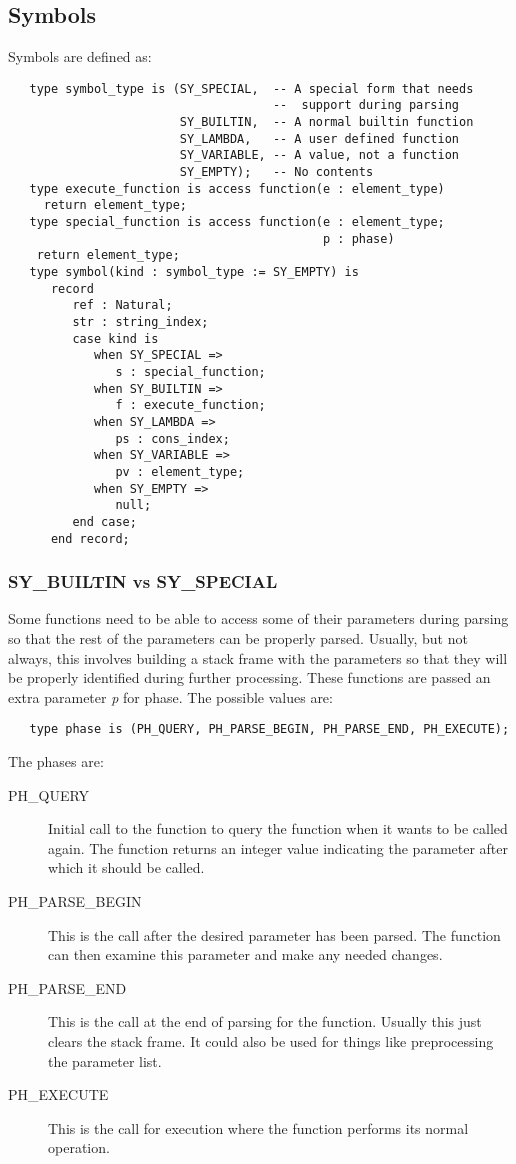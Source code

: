 \documentclass[10pt, openany]{book}
\begin{document}
\subsection{Symbols}
\label{sec:Symbols}
Symbols are defined as:
\begin{lstlisting}
   type symbol_type is (SY_SPECIAL,  -- A special form that needs
                                     --  support during parsing
                        SY_BUILTIN,  -- A normal builtin function
                        SY_LAMBDA,   -- A user defined function
                        SY_VARIABLE, -- A value, not a function
                        SY_EMPTY);   -- No contents
   type execute_function is access function(e : element_type)
     return element_type;
   type special_function is access function(e : element_type;
                                            p : phase)
    return element_type;
   type symbol(kind : symbol_type := SY_EMPTY) is
      record
         ref : Natural;
         str : string_index;
         case kind is
            when SY_SPECIAL =>
               s : special_function;
            when SY_BUILTIN =>
               f : execute_function;
            when SY_LAMBDA =>
               ps : cons_index;
            when SY_VARIABLE =>
               pv : element_type;
            when SY_EMPTY =>
               null;
         end case;
      end record;
\end{lstlisting}

\subsubsection{SY\_BUILTIN vs SY\_SPECIAL}
Some functions need to be able to access some of their parameters during parsing so that the rest of the parameters can be properly parsed.  Usually, but not always, this involves building a stack frame with the parameters so that they will be properly identified during further processing.  These functions are passed an extra parameter \emph{p} for phase.  The possible values are:
\begin{lstlisting}
   type phase is (PH_QUERY, PH_PARSE_BEGIN, PH_PARSE_END, PH_EXECUTE);
\end{lstlisting}

The phases are:
\begin{description}
  \item[PH\_QUERY] Initial call to the function to query the function when it wants to be called again.  The function returns an integer value indicating the parameter after which it should be called.
  \item[PH\_PARSE\_BEGIN] This is the call after the desired parameter has been parsed.  The function can then examine this parameter and make any needed changes.
  \item[PH\_PARSE\_END] This is the call at the end of parsing for the function.  Usually this just clears the stack frame.  It could also be used for things like preprocessing the parameter list.
  \item[PH\_EXECUTE] This is the call for execution where the function performs its normal operation.
\end{description}
\end{document}
